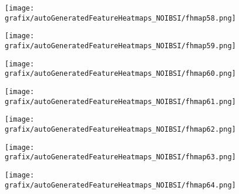 \begin{subfigure}{\wid\textwidth} 
    \centering 
    \caption{\tiny \sffamily {}} 
    \vspace{\vsp} 
    \texttt{[image: grafix/autoGeneratedFeatureHeatmaps\_NOIBSI/fhmap58.png]} 
\end{subfigure} 
\hspace{\hsp} 
\begin{subfigure}{\wid\textwidth} 
    \centering 
    \caption{\tiny \sffamily {}} 
    \vspace{\vsp} 
    \texttt{[image: grafix/autoGeneratedFeatureHeatmaps\_NOIBSI/fhmap59.png]} 
\end{subfigure} 
\hspace{\hsp} 
\begin{subfigure}{\wid\textwidth} 
    \centering 
    \caption{\tiny \sffamily {}} 
    \vspace{\vsp} 
    \texttt{[image: grafix/autoGeneratedFeatureHeatmaps\_NOIBSI/fhmap60.png]} 
\end{subfigure} 
\hspace{\hsp} 
\begin{subfigure}{\wid\textwidth} 
    \centering 
    \caption{\tiny \sffamily {}} 
    \vspace{\vsp} 
    \texttt{[image: grafix/autoGeneratedFeatureHeatmaps\_NOIBSI/fhmap61.png]} 
\end{subfigure} 
\hspace{\hsp} 
\begin{subfigure}{\wid\textwidth} 
    \centering 
    \caption{\tiny \sffamily {}} 
    \vspace{\vsp} 
    \texttt{[image: grafix/autoGeneratedFeatureHeatmaps\_NOIBSI/fhmap62.png]} 
\end{subfigure} 
\hspace{\hsp} 
\begin{subfigure}{\wid\textwidth} 
    \centering 
    \caption{\tiny \sffamily {}} 
    \vspace{\vsp} 
    \texttt{[image: grafix/autoGeneratedFeatureHeatmaps\_NOIBSI/fhmap63.png]} 
\end{subfigure} 
\hspace{\hsp} 
\begin{subfigure}{\wid\textwidth} 
    \centering 
    \caption{\tiny \sffamily {}} 
    \vspace{\vsp} 
    \texttt{[image: grafix/autoGeneratedFeatureHeatmaps\_NOIBSI/fhmap64.png]} 
\end{subfigure} 
